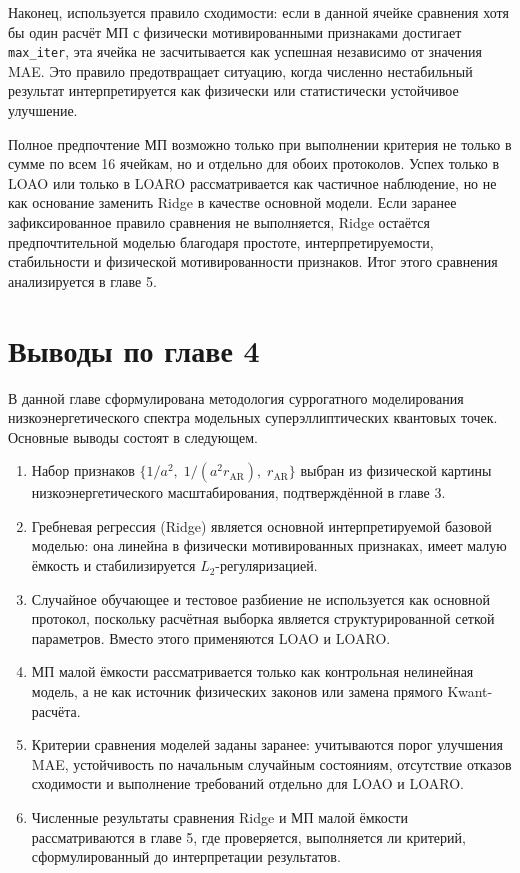 Наконец, используется правило сходимости: если в данной ячейке сравнения хотя бы один
расчёт МП с физически мотивированными признаками достигает \texttt{max\_iter}, эта ячейка
не засчитывается как успешная независимо от значения MAE. Это правило предотвращает
ситуацию, когда численно нестабильный результат интерпретируется как физически или
статистически устойчивое улучшение.

Полное предпочтение МП возможно только при выполнении критерия не только в сумме по всем
16 ячейкам, но и отдельно для обоих протоколов. Успех только в LOAO или только в LOARO
рассматривается как частичное наблюдение, но не как основание заменить Ridge в качестве
основной модели. Если заранее зафиксированное правило сравнения не выполняется, Ridge
остаётся предпочтительной моделью благодаря простоте, интерпретируемости, стабильности и
физической мотивированности признаков. Итог этого сравнения анализируется в главе 5.

\section{Выводы по главе 4}

В данной главе сформулирована методология суррогатного моделирования низкоэнергетического
спектра модельных суперэллиптических квантовых точек. Основные выводы состоят в следующем.

\begin{enumerate}
  \item Набор признаков $\{1/a^2,\;1/(a^2 r_{\mathrm{AR}}),\;r_{\mathrm{AR}}\}$ выбран из
  физической картины низкоэнергетического масштабирования, подтверждённой в главе 3.
  \item Гребневая регрессия (Ridge) является основной интерпретируемой базовой моделью:
  она линейна в физически мотивированных признаках, имеет малую ёмкость и стабилизируется
  $L_2$-регуляризацией.
  \item Случайное обучающее и тестовое разбиение не используется как основной протокол,
  поскольку расчётная выборка является структурированной сеткой параметров. Вместо этого
  применяются LOAO и LOARO.
  \item МП малой ёмкости рассматривается только как контрольная нелинейная модель, а не
  как источник физических законов или замена прямого Kwant-расчёта.
  \item Критерии сравнения моделей заданы заранее: учитываются порог улучшения MAE,
  устойчивость по начальным случайным состояниям, отсутствие отказов сходимости и
  выполнение требований отдельно для LOAO и LOARO.
  \item Численные результаты сравнения Ridge и МП малой ёмкости рассматриваются в главе 5,
  где проверяется, выполняется ли критерий, сформулированный до интерпретации результатов.
\end{enumerate}

\clearpage
